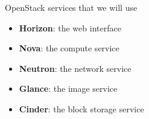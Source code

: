 \documentclass[english,serif,mathserif,usenames,dvipsnames]{beamer}
\begin{document}
\begin{frame}
  {OpenStack services that we will use}

  \begin{itemize}
  \item \textbf{Horizon}: the web interface
  \+\item \textbf{Nova}: the compute service
  \+\item \textbf{Neutron}: the network service
  \+\item \textbf{Glance}: the image service
  \+\item \textbf{Cinder}: the block storage service
  \+
\end{itemize}
\end{frame}
\end{document}

